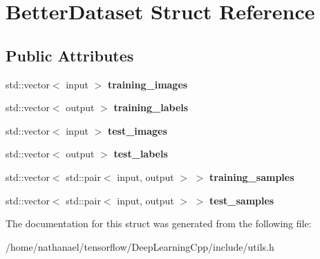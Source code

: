 \hypertarget{structBetterDataset}{}\section{Better\+Dataset Struct Reference}
\label{structBetterDataset}
\subsection*{Public Attributes}
\begin{DoxyCompactItemize}
\item 
\mbox{\label{structBetterDataset_acc172e1eea32b5c9365f61cb46b93f75}} 
std\+::vector$<$ input $>$ {\bfseries training\+\_\+images}
\item 
\mbox{\label{structBetterDataset_a1ebd4a94958b60cb48711211d949a37c}} 
std\+::vector$<$ output $>$ {\bfseries training\+\_\+labels}
\item 
\mbox{\label{structBetterDataset_a797c95328073aec60368036229f7c5fc}} 
std\+::vector$<$ input $>$ {\bfseries test\+\_\+images}
\item 
\mbox{\label{structBetterDataset_ab35c5fd7128b488a09055e530ee2ea1f}} 
std\+::vector$<$ output $>$ {\bfseries test\+\_\+labels}
\item 
\mbox{\label{structBetterDataset_a98c431ad00c966af83d05ac0fbb4ab00}} 
std\+::vector$<$ std\+::pair$<$ input, output $>$ $>$ {\bfseries training\+\_\+samples}
\item 
\mbox{\label{structBetterDataset_acfe9db1614bcd528d2da9ea8ec159781}} 
std\+::vector$<$ std\+::pair$<$ input, output $>$ $>$ {\bfseries test\+\_\+samples}
\end{DoxyCompactItemize}


The documentation for this struct was generated from the following file\+:\begin{DoxyCompactItemize}
\item 
/home/nathanael/tensorflow/\+Deep\+Learning\+Cpp/include/utils.\+h\end{DoxyCompactItemize}
